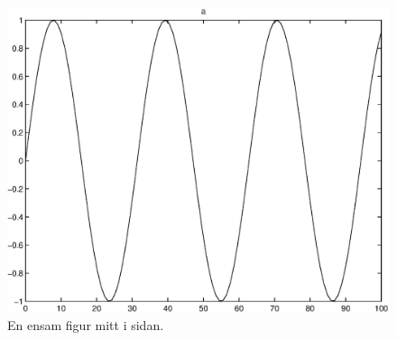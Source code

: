 \begin{figure}[htb]
  \begin{center}
\includegraphics[width=0.8\linewidth]{images/sin.eps}
  \end{center}
  \caption[En ensam figur.]{En ensam figur mitt i sidan.}
\label{fig:center}
\end{figure}

